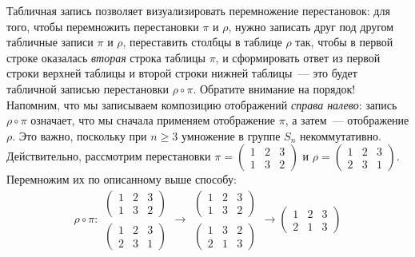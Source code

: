 Табличная запись позволяет визуализировать перемножение перестановок:
для того, чтобы перемножить перестановки $\pi$ и $\rho$, нужно
записать друг под другом табличные записи $\pi$ и $\rho$, переставить
столбцы в таблице $\rho$ так, чтобы в первой строке оказалась {\it
  вторая} строка таблицы $\pi$, и сформировать ответ из первой строки
верхней таблицы и второй строки нижней таблицы~--- это будет табличной
записью перестановки $\rho\circ\pi$. Обратите внимание на порядок!
Напомним, что мы записываем композицию отображений {\it справа
  налево}: запись $\rho\circ\pi$ означает, что мы сначала применяем
отображение $\pi$, а затем~--- отображение $\rho$.
Это важно, поскольку при $n\geq 3$ умножение в группе $S_n$
некоммутативно. Действительно, рассмотрим перестановки
$\pi=\begin{pmatrix}1 & 2 & 3 \\ 1 & 3 & 2\end{pmatrix}$ и
$\rho=\begin{pmatrix}1 & 2 & 3 \\ 2 & 3 & 1\end{pmatrix}$.
Перемножим их по описанному выше способу:
$$
\rho\circ\pi\colon
\begin{matrix}
\begin{pmatrix}1 & 2 & 3 \\ 1 & 3 & 2\end{pmatrix}
\\
\begin{pmatrix}1 & 2 & 3 \\ 2 & 3 & 1\end{pmatrix}
\end{matrix}
\to
\begin{matrix}
\begin{pmatrix}1 & 2 & 3 \\ 1 & 3 & 2\end{pmatrix}
\\
\begin{pmatrix}1 & 3 & 2 \\ 2 & 1 & 3\end{pmatrix}
\end{matrix}
\to
\begin{pmatrix}1 & 2 & 3 \\ 2 & 1 & 3\end{pmatrix}
$$
